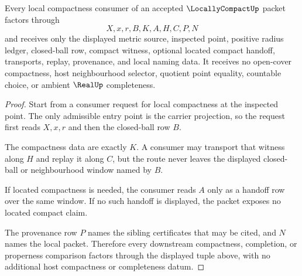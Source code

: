 \begin{theorem}
\label{thm:locally-compact-closed-ball-neighborhood-base}
Every local compactness consumer of an accepted $\LocallyCompactUp$ packet factors through
$$
X,x,r,B,K,A,H,C,P,N
$$
and receives only the displayed metric source, inspected point, positive radius ledger, closed-ball row, compact witness, optional located compact handoff, transports, replay, provenance, and local naming data. It receives no open-cover compactness, host neighbourhood selector, quotient point equality, countable choice, or ambient $\RealUp$ completeness.
\end{theorem}
\begin{proof}
Start from a consumer request for local compactness at the inspected point. The only admissible entry point is the carrier projection, so the request first reads $X,x,r$ and then the closed-ball row $B$.

The compactness data are exactly $K$. A consumer may transport that witness along $H$ and replay it along $C$, but the route never leaves the displayed closed-ball or neighbourhood window named by $B$.

If located compactness is needed, the consumer reads $A$ only as a handoff row over the same window. If no such handoff is displayed, the packet exposes no located compact claim.

The provenance row $P$ names the sibling certificates that may be cited, and $N$ names the local packet. Therefore every downstream compactness, completion, or properness comparison factors through the displayed tuple above, with no additional host compactness or completeness datum.
\end{proof}


